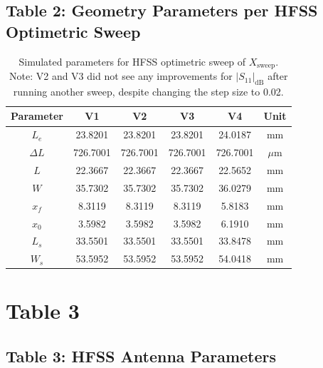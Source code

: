 \documentclass[compress,aspectratio=169,10pt]{beamer}
\begin{document}
\subsection[Table 2]{Table 2: Geometry Parameters per HFSS Optimetric Sweep}
\begin{frame}
    \begin{table}
        \centering
        \footnotesize
        \begin{tabular}{|c|c|c|c|c|c|}
            \hline
            \textbf{Parameter} & \textbf{V1} & \textbf{V2} & \textbf{V3} & \textbf{V4} & \textbf{Unit} \\
            \hline
            $L_e$ & 23.8201 & 23.8201 & 23.8201 & 24.0187 & mm \\
            \hline
            $\Delta L$ & 726.7001 & 726.7001 & 726.7001 & 726.7001 & $\mu$m \\
            \hline
            $L$ & 22.3667 & 22.3667 & 22.3667 & 22.5652 & mm \\
            \hline
            $W$ & 35.7302 & 35.7302 & 35.7302 & 36.0279 & mm \\
            \hline
            $x_f$ & 8.3119 & 8.3119 & 8.3119 & 5.8183 & mm \\
            \hline
            $x_0$ & 3.5982 & 3.5982 & 3.5982 & 6.1910 & mm \\
            \hline
            $L_s$ & 33.5501 & 33.5501 & 33.5501 & 33.8478 & mm \\
            \hline
            $W_s$ & 53.5952 & 53.5952 & 53.5952 & 54.0418 & mm \\
            \hline
        \end{tabular}
        \caption{\small Simulated parameters for HFSS optimetric sweep of $X_{\text{sweep}}$. Note: V2 and V3 did not see any improvements for $|S_{11}|_{\text{dB}}$ after running another sweep, despite changing the step size to 0.02.}
	        \label{tab:simulated-params}
	    \end{table}
\end{frame}
\section[Table 3]{Table 3}

\subsection[Table 3]{Table 3: HFSS Antenna Parameters}
\end{document}
